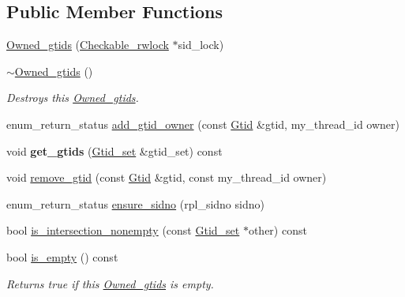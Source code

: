 \subsection*{Public Member Functions}
\begin{DoxyCompactItemize}
\item 
\mbox{\hyperlink{classOwned__gtids_a7b91d015754445c004455b37096da3f1}{Owned\+\_\+gtids}} (\mbox{\hyperlink{classCheckable__rwlock}{Checkable\+\_\+rwlock}} $\ast$sid\+\_\+lock)
\item 
\mbox{\label{classOwned__gtids_ad91e433dfe634b5c501a681a145aabfb}} 
\mbox{\hyperlink{classOwned__gtids_ad91e433dfe634b5c501a681a145aabfb}{$\sim$\+Owned\+\_\+gtids}} ()
\begin{DoxyCompactList}\small\item\em Destroys this \mbox{\hyperlink{classOwned__gtids}{Owned\+\_\+gtids}}. \end{DoxyCompactList}\item 
enum\+\_\+return\+\_\+status \mbox{\hyperlink{classOwned__gtids_a323fa3724e5214e36bac9153e9cb3585}{add\+\_\+gtid\+\_\+owner}} (const \mbox{\hyperlink{structGtid}{Gtid}} \&gtid, my\+\_\+thread\+\_\+id owner)
\item 
\mbox{\label{classOwned__gtids_aa4499c42b596c5ebd0e0cf7227783532}} 
void {\bfseries get\+\_\+gtids} (\mbox{\hyperlink{classGtid__set}{Gtid\+\_\+set}} \&gtid\+\_\+set) const
\item 
void \mbox{\hyperlink{classOwned__gtids_afc63a8ed9cff1f2dddd102176535073d}{remove\+\_\+gtid}} (const \mbox{\hyperlink{structGtid}{Gtid}} \&gtid, const my\+\_\+thread\+\_\+id owner)
\item 
enum\+\_\+return\+\_\+status \mbox{\hyperlink{classOwned__gtids_aed0354047916db07b6a854e621f48674}{ensure\+\_\+sidno}} (rpl\+\_\+sidno sidno)
\item 
bool \mbox{\hyperlink{classOwned__gtids_a39d5a45f8d36a5ae5efb668babcd9e09}{is\+\_\+intersection\+\_\+nonempty}} (const \mbox{\hyperlink{classGtid__set}{Gtid\+\_\+set}} $\ast$other) const
\item 
\mbox{\label{classOwned__gtids_a64a21addf48daf859e338e8f8f49695e}} 
bool \mbox{\hyperlink{classOwned__gtids_a64a21addf48daf859e338e8f8f49695e}{is\+\_\+empty}} () const
\begin{DoxyCompactList}\small\item\em Returns true if this \mbox{\hyperlink{classOwned__gtids}{Owned\+\_\+gtids}} is empty. \end{DoxyCompactList}\item 

\end{DoxyCompactItemize}
